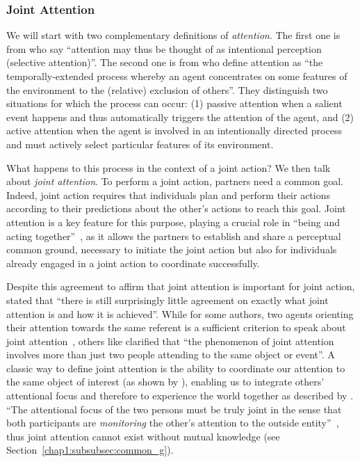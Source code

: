 \documentclass[a4paper,11pt,twoside]{StyleThese}
\begin{document}
\subsubsection{Joint Attention}\label{chap1:subsubsec:joint_att}
We will start with two complementary definitions of \emph{attention}. The first one is from \citet[p.~677]{tomasello_2005_understanding} who say ``attention may thus be thought of as intentional perception (selective attention)''. The second one is from \citet[p.~138]{kaplan_2006_challenges} who define attention as ``the temporally-extended process whereby an agent concentrates on some features of the environment to the (relative) exclusion of others''. They distinguish two situations for which the process can occur: (1) passive attention when a salient event happens and thus automatically triggers the attention of the agent, and (2) active attention when the agent is involved in an
intentionally directed process and must actively select particular features of its environment. 

What happens to this process in the context of a joint action? We then talk about \emph{joint attention}. To perform a joint action, partners need a common goal. Indeed, joint action requires that individuals plan and perform their actions according to their predictions about the other’s actions to reach this goal. Joint attention is a key feature for this purpose, playing a crucial role in ``being and acting together''~\citep{tomasello_2009_cultural}, as it allows the partners to establish and share a perceptual common ground, necessary to initiate the joint action but also for individuals already engaged in a joint action to coordinate successfully. 

Despite this agreement to affirm that joint attention is important for joint action, \citet[p.~260]{siposova_2019_new} stated that ``there is still surprisingly little agreement on exactly what joint attention is and how it is achieved''. While for some authors, two agents orienting their attention towards the same referent is a sufficient criterion to speak about joint attention~\citep{butterworth_1991_minds}, others like \citet[p.~355]{pacherie_2012_agency} clarified that ``the phenomenon of joint attention involves more than just two people attending to the same object or event''. A classic way to define joint attention is the ability to coordinate our attention to the same object of interest (\eg as shown by \cite{bakeman_1984_coordinating}), enabling us to integrate others’ attentional focus and therefore to experience the world together as described by \cite{tomasello_2009_cultural}.  ``The attentional focus of the two persons must be truly joint in the sense that both participants are \emph{monitoring} the other's attention to the outside entity''~\citep[p.~106]{tomasello_1995_joint}, thus joint attention cannot exist without mutual knowledge (see Section~\ref{chap1:subsubsec:common_g}).
\end{document}
